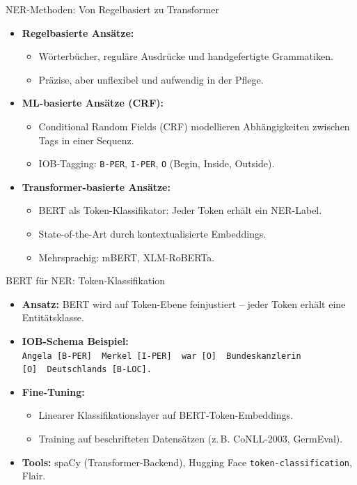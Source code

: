 \documentclass[aspectratio=1610, xcolor=dvipsnames, 9pt]{beamer}
\begin{document}
\begin{frame}{NER-Methoden: Von Regelbasiert zu Transformer}
  \begin{itemize}
    \item \textbf{Regelbasierte Ansätze:}
      \begin{itemize}
        \item Wörterbücher, reguläre Ausdrücke und handgefertigte Grammatiken.
        \item Präzise, aber unflexibel und aufwendig in der Pflege.
      \end{itemize}
    \item \textbf{ML-basierte Ansätze (CRF):}
      \begin{itemize}
        \item Conditional Random Fields (CRF) modellieren Abhängigkeiten zwischen Tags in einer Sequenz.
        \item IOB-Tagging: \texttt{B-PER}, \texttt{I-PER}, \texttt{O} (Begin, Inside, Outside).
      \end{itemize}
    \item \textbf{Transformer-basierte Ansätze:}
      \begin{itemize}
        \item BERT als Token-Klassifikator: Jeder Token erhält ein NER-Label.
        \item State-of-the-Art durch kontextualisierte Embeddings.
        \item Mehrsprachig: mBERT, XLM-RoBERTa.
      \end{itemize}
  \end{itemize}
\end{frame}

\begin{frame}{BERT für NER: Token-Klassifikation}
  \begin{itemize}
    \item \textbf{Ansatz:} BERT wird auf Token-Ebene feinjustiert -- jeder Token erhält eine Entitätsklasse.
    \item \textbf{IOB-Schema Beispiel:}\\[0.3cm]
      \texttt{Angela [B-PER]\ \ Merkel [I-PER]\ \ war [O]\ \ Bundeskanzlerin [O]\ \ Deutschlands [B-LOC].}
    \vspace{0.3cm}
    \item \textbf{Fine-Tuning:}
      \begin{itemize}
        \item Linearer Klassifikationslayer auf BERT-Token-Embeddings.
        \item Training auf beschrifteten Datensätzen (z.\,B. CoNLL-2003, GermEval).
      \end{itemize}
    \item \textbf{Tools:} spaCy (Transformer-Backend), Hugging Face \texttt{token-classification}, Flair.
  \end{itemize}
\end{frame}
\end{document}
